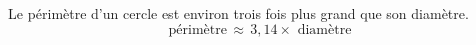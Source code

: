 Le périmètre d'un cercle est environ trois fois plus grand que son diamètre.
$$\text{périmètre}\,\approx\,3,14\times\text{ diamètre}$$